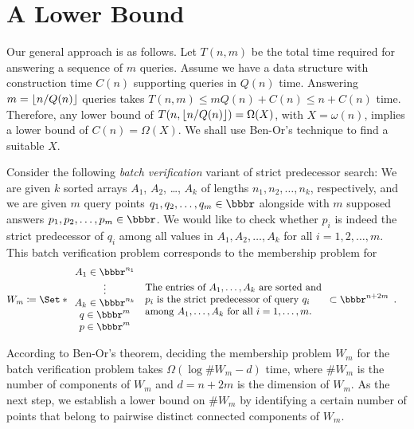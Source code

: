 \documentclass[orivec]{llncs}
\DeclarePairedDelimiter\floor{\lfloor}{\rfloor}
\newcommand{\R}{\ensuremath{\bbbr}}
\begin{document}
\section{A Lower Bound} \label{sec::lowerbound}

Our general approach is as follows. Let \(T(n,m)\) be the total time required for answering a sequence of \(m\) queries. Assume we have a data structure with construction time \(C(n)\) supporting queries in \(Q(n)\) time. Answering \(m = \floor*{n / Q(n)}\) queries takes \(T(n,m) \le m Q(n) + C(n) \le n + C(n) \) time. Therefore, any lower bound of \(T(n,\floor*{n / Q(n)}) = \Omega(X)\), with \(X = \omega(n)\), implies a lower bound of \(C(n) = \Omega(X)\). We shall use Ben-Or's technique to find a suitable \(X\). 

Consider the following \emph{batch verification} variant of strict predecessor search: We are given \(k\) sorted arrays \(A_1\), \(A_2\), \dots, \(A_k\) of lengths \(n_1,n_2,\dots,n_k\), respectively, and we are given \(m\) query points \(q_1,q_2,\dots, q_m \in \R \) alongside with \(m\) supposed answers \(p_1,p_2,\dots,p_m\in \R\). We would like to check whether \(p_i\) is indeed the strict predecessor of \(q_i\) among all values in \(A_1,A_2,\dots, A_k\) for all \(i=1,2,\dots,m\). This batch verification problem corresponds to the membership problem for 
\begin{align*}
	W_m &\coloneqq \Set*{ \begin{array}{c} A_1 \in \R^{n_1}  \\ \vdots \\ A_k \in \R^{n_k} \\ q \in \R^m \\  p \in \R^m \end{array} }{
	\begin{array}{l} \text{The entries of } A_1, \dots, A_k \text{ are sorted and} \\
	 p_i \text{ is the strict predecessor of query } q_i  \\
	\text{among } A_1, \dots, A_k  \text{ for all } i = 1, \dots, m .\end{array}} \subset \R^{n + 2m} \enspace . 
\end{align*}

According to Ben-Or's theorem, deciding the membership problem \(W_m\) for the batch verification problem takes \(\Omega(\log\#W_m - d)\) time, where \(\#W_m\) is the number of components of \(W_m\) and \(d = n + 2m\) is the dimension of \(W_m\). As the next step, we establish a lower bound on \(\#W_m\) by identifying a certain number of points that belong to pairwise distinct connected components of \(W_m\).
\end{document}
